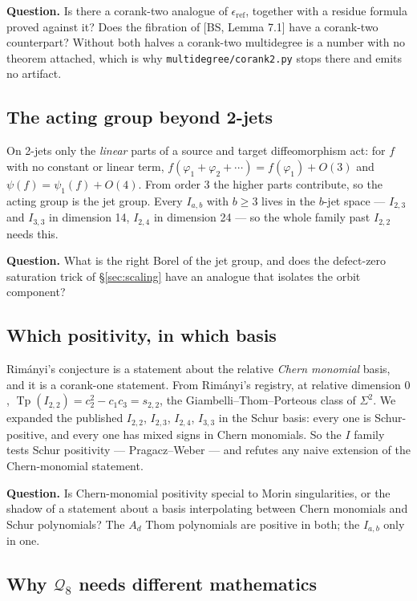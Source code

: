 \documentclass[11pt,a4paper]{article}
\DeclareMathOperator{\Tp}{Tp}
\newcommand{\Qd}{\mathcal{Q}}
\newcommand{\eref}{\epsilon_{\mathrm{ref}}}
\theoremstyle{plain}
\theoremstyle{definition}
\theoremstyle{remark}
\begin{document}
\textbf{Question.} Is there a corank-two analogue of $\eref$, together with a residue formula proved
against it? Does the fibration of [BS, Lemma 7.1] have a corank-two counterpart? Without both halves
a corank-two multidegree is a number with no theorem attached, which is why
\texttt{multidegree/corank2.py} stops there and emits no artifact.

\subsection{The acting group beyond 2-jets}

On 2-jets only the \emph{linear} parts of a source and target diffeomorphism act: for $f$ with no
constant or linear term, $f(\varphi_1 + \varphi_2 + \cdots) = f(\varphi_1) + O(3)$ and
$\psi(f) = \psi_1(f) + O(4)$. From order 3 the higher parts contribute, so the acting group is the
jet group. Every $I_{a,b}$ with $b \ge 3$ lives in the $b$-jet space --- $I_{2,3}$ and $I_{3,3}$ in
dimension 14, $I_{2,4}$ in dimension 24 --- so the whole family past $I_{2,2}$ needs this.

\textbf{Question.} What is the right Borel of the jet group, and does the defect-zero saturation
trick of \S\ref{sec:scaling} have an analogue that isolates the orbit component?

\subsection{Which positivity, in which basis}

Rimányi's conjecture is a statement about the relative \emph{Chern monomial} basis, and it is a
corank-one statement. From Rimányi's registry, at relative dimension $0$,
$\Tp(I_{2,2}) = c_2^2 - c_1c_3 = s_{2,2}$, the Giambelli--Thom--Porteous class of $\Sigma^2$. We
expanded the published $I_{2,2}$, $I_{2,3}$, $I_{2,4}$, $I_{3,3}$ in the Schur basis: every one is
Schur-positive, and every one has mixed signs in Chern monomials. So the $I$ family tests Schur
positivity --- Pragacz--Weber --- and refutes any naive extension of the Chern-monomial statement.

\textbf{Question.} Is Chern-monomial positivity special to Morin singularities, or the shadow of a
statement about a basis interpolating between Chern monomials and Schur polynomials? The $A_d$ Thom
polynomials are positive in both; the $I_{a,b}$ only in one.

\subsection{Why \texorpdfstring{$\Qd_8$}{Q\_8} needs different mathematics}
\end{document}
